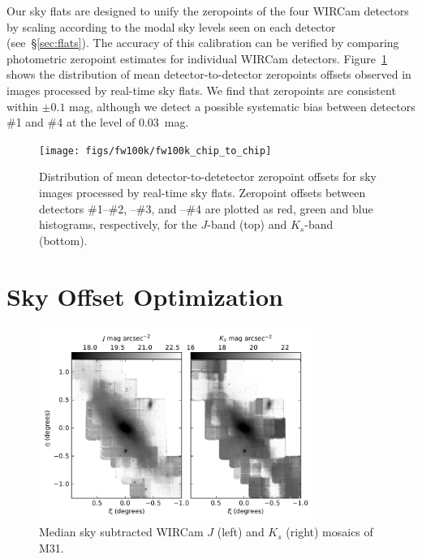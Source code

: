 \documentclass[iop]{emulateapj}
\newcommand{\mycomment}[1]{\textcolor{OliveGreen}{\textit{#1}}} %
\newcommand{\Fig}[1]{Fig.~\ref{fig:#1}}  %
\newcommand{\Sec}[1]{\S\ref{sec:#1}}  %
\begin{document}
Our sky flats are designed to unify the zeropoints of the four WIRCam detectors by scaling according to the modal sky levels seen on each detector (see~\Sec{flats}).
The accuracy of this calibration can be verified by comparing photometric zeropoint estimates for individual WIRCam detectors.
Figure~\ref{fig:fw100k_chip_to_chip} shows the distribution of mean detector-to-detector zeropoints offsets observed in images processed by real-time sky flats. We find that zeropoints are consistent within $\pm 0.1$ mag, although we detect a possible systematic bias between detectors \#1 and \#4 at the level of $0.03$~mag.

\begin{figure}[t]
\centering
\texttt{[image: figs/fw100k/fw100k\_chip\_to\_chip]}
\caption{Distribution of mean detector-to-detetector zeropoint offsets for sky images processed by real-time sky flats. Zeropoint offsets between detectors \#1--\#2, --\#3, and --\#4 are plotted as
red, green and blue histograms, respectively, for the $J$-band (top) and $K_s$-band (bottom).}
\label{fig:fw100k_chip_to_chip}
\end{figure}

\section{Sky Offset Optimization}
\label{sec:scalar}

\begin{figure}[t]
\centering
\includegraphics[width=3.5in]{figs/raw_mosaics}
\caption{Median sky subtracted WIRCam $J$ (left) and $K_s$ (right) mosaics of M31.}
\label{fig:raw_mosaics}
\end{figure}
\end{document}
